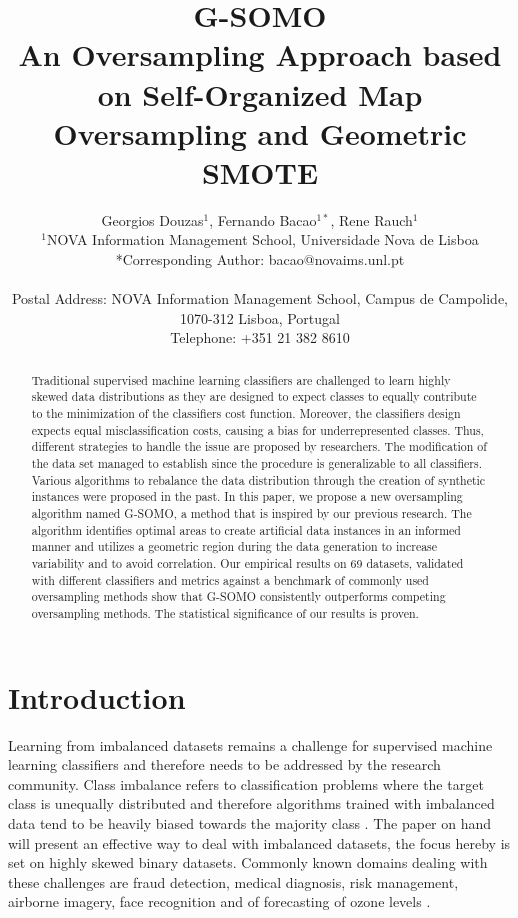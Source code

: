 \documentclass[parskip=full]{scrartcl}
\title{G-SOMO \\ \LARGE{An Oversampling Approach based on Self-Organized Map Oversampling and Geometric SMOTE}}
\author{
	Georgios Douzas\(^{1}\), Fernando Bacao\(^{1*}\), Rene Rauch\(^{1}\)
	\\
	\small{\(^{1}\)NOVA Information Management School, Universidade Nova de Lisboa}
	\\
	\small{*Corresponding Author: bacao@novaims.unl.pt}
	\\
	\\
	\small{Postal Address: NOVA Information Management School, Campus de Campolide, 1070-312 Lisboa, Portugal}
	\\
	\small{Telephone: +351 21 382 8610}
}
\date{}
\begin{document}
\maketitle

\begin{abstract}
Traditional supervised machine learning classifiers are challenged to learn highly skewed data 
distributions as they are designed to expect classes to equally contribute to the minimization 
of the classifiers cost function. Moreover, the classifiers design expects equal 
misclassification costs, causing a bias for underrepresented classes. Thus, different 
strategies to handle the issue are proposed by researchers. The modification of the data set 
managed to establish since the procedure is generalizable to all classifiers. Various algorithms 
to rebalance the data distribution through the creation of synthetic instances were proposed in the 
past.  In this paper, we propose a new oversampling algorithm named G-SOMO, a method that is 
inspired by our previous research. The algorithm identifies optimal areas to create artificial 
data instances in an informed manner and utilizes a geometric region during the data generation 
to increase variability and to avoid correlation. Our empirical results on 69 datasets, validated 
with different classifiers and metrics against a benchmark of commonly used oversampling methods 
show that G-SOMO consistently outperforms competing oversampling methods. 
The statistical significance of our results is proven. 
\end{abstract}

\section{Introduction}

Learning from imbalanced datasets remains a challenge for supervised machine learning classifiers 
and therefore needs to be addressed by the research community. Class imbalance refers to 
classification problems where the target class is unequally distributed and therefore algorithms 
trained with imbalanced data tend to be heavily biased towards the majority class \cite{Hoens2013}. 
The paper on hand will present an effective way to deal with imbalanced datasets, the focus hereby is 
set on highly skewed binary datasets. Commonly known domains dealing with these challenges are 
fraud detection, medical diagnosis, risk management, airborne imagery, face recognition and of forecasting 
of ozone levels \cite{Akbani2004}.
\end{document}
